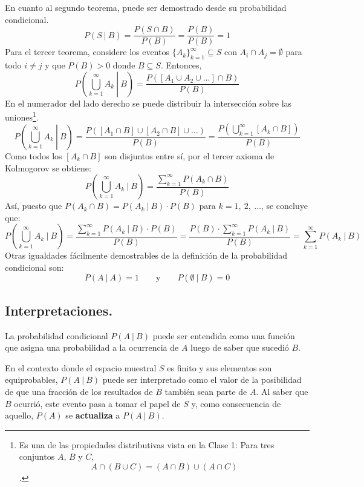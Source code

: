\documentclass[12pt]{article}
\begin{document}
En cuanto al segundo teorema, puede ser demostrado desde su probabilidad condicional.
\[
  P(S \ | \ B) = \frac{P(S \cap B)}{P(B)} = \frac{P(B)}{P(B)} = 1
\]
Para el tercer teorema, considere los eventos $\{A_{k}\}_{k = 1}^{\infty} \subseteq S$ con $A_{i} \cap A_{j} = \emptyset$ para todo $i \neq j$ y que $P(B) > 0$ donde $B \subseteq S$. Entonces,
\[
  P\left(\bigcup_{k = 1}^{\infty} A_{k} \ \left|\right. \ B\right) = \frac{P([A_{1} \cup A_{2} \cup \ldots] \cap B)}{P(B)}
\]
En el numerador del lado derecho se puede distribuir la intersección sobre las uniones\footnote{Es una de las propiedades distributivas vista en la Clase 1: Para tres conjuntos $A$, $B$ y $C$, \[A \cap (B \cup C) = (A \cap B) \cup (A \cap C)\].}.
\[
  P\left(\bigcup_{k = 1}^{\infty} A_{k} \ \left|\right. \ B\right) = \frac{P([A_{1} \cap B] \cup [A_{2} \cap B] \cup \ldots)}{P(B)}
                                                                   = \frac{P\left(\bigcup_{k = 1}^{\infty} [A_{k} \cap B]\right)}{P(B)}
\]
Como todos los $[A_{k} \cap B]$ son disjuntos entre sí, por el tercer axioma de Kolmogorov se obtiene:
\[
  P\left(\bigcup_{k = 1}^{\infty} A_{k} \ | \ B\right) = \frac{\sum_{k = 1}^{\infty} P(A_{k} \cap B)}{P(B)}
\]
Así, puesto que $P(A_{k} \cap B) = P(A_{k} \ | \ B) \cdot P(B)$ para $k = 1, \ 2, \ \ldots$, se concluye que:
\[
  P\left(\bigcup_{k = 1}^{\infty} A_{k} \ | \ B\right) = \frac{\sum_{k = 1}^{\infty} P(A_{k} \ | \ B) \cdot P(B)}{P(B)}
                                                       = \frac{P(B) \cdot \sum_{k = 1}^{\infty} P(A_{k} \ | \ B)}{P(B)}
                                                       = \sum_{k = 1}^{\infty} P(A_{k} \ | \ B)
\]
Otras igualdades fácilmente demostrables de la definición de la probabilidad condicional son:
\[
  P(A \ | \ A) = 1 \qquad \text{y} \qquad P(\emptyset \ | \ B) = 0
\]

\subsection{Interpretaciones.}

La probabilidad condicional $P(A \ | \ B)$ puede ser entendida como una función que asigna una probabilidad a la ocurrencia de $A$ luego de saber que sucedió $B$.

En el contexto donde el espacio muestral $S$ es finito y sus elementos son equiprobables, $P(A \ | \ B)$ puede ser interpretado como el valor de la posibilidad de que una fracción de los resultados de $B$ también sean parte de $A$. Al saber que $B$ ocurrió, este evento pasa a tomar el papel de $S$ y, como consecuencia de aquello, $P(A)$ se \textbf{actualiza} a $P(A \ | \ B)$.
\end{document}
